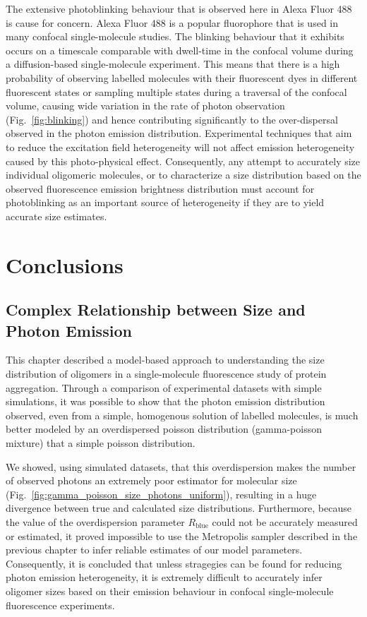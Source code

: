 The extensive photoblinking behaviour that is observed here in Alexa Fluor 488 is cause for concern. Alexa Fluor 488 is a popular fluorophore that is used in many confocal single-molecule studies. The blinking behaviour that it exhibits occurs on a timescale comparable with dwell-time in the confocal volume during a diffusion-based single-molecule experiment. This means that there is a high probability of observing labelled molecules with their fluorescent dyes in different fluorescent states or sampling multiple states during a traversal of the confocal volume, causing wide variation in the rate of photon observation (Fig.~\ref{fig:blinking}) and hence contributing significantly to the over-dispersal observed in the photon emission distribution. Experimental techniques that aim to reduce the excitation field heterogeneity will not affect emission heterogeneity caused by this photo-physical effect. Consequently, any attempt to accurately size individual oligomeric molecules, or to characterize a size distribution based on the observed fluorescence emission brightness distribution must account for photoblinking as an important source of heterogeneity if they are to yield accurate size estimates.      

\section{Conclusions}
\subsection{Complex Relationship between Size and Photon Emission}
This chapter described a model-based approach to understanding the size distribution of oligomers in a single-molecule fluorescence study of protein aggregation. Through a comparison of experimental datasets with simple simulations, it was possible to show that the photon emission distribution observed, even from a simple, homogenous solution of labelled molecules, is much better modeled by an overdispersed poisson distribution (gamma-poisson mixture) that a simple poisson distribution.

We showed, using simulated datasets, that this overdispersion makes the number of observed photons an extremely poor estimator for molecular size (Fig.~\ref{fig:gamma_poisson_size_photons_uniform}), resulting in a huge divergence between true and calculated size distributions. Furthermore, because the value of the overdispersion parameter $R_{\text{blue}}$ could not be accurately measured or estimated, it proved impossible to use the Metropolis sampler described in the previous chapter to infer reliable estimates of our model parameters. Consequently, it is concluded that unless stragegies can be found for reducing photon emission heterogeneity, it is extremely difficult to accurately infer oligomer sizes based on their emission behaviour in confocal single-molecule fluorescence experiments.

